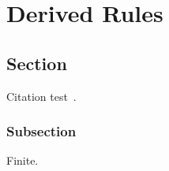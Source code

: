 \chapter{Derived Rules}\label{chapter:derived}

\section{Section}
Citation test~\parencite{Paulson1989}.

\subsection{Subsection}

Finite.